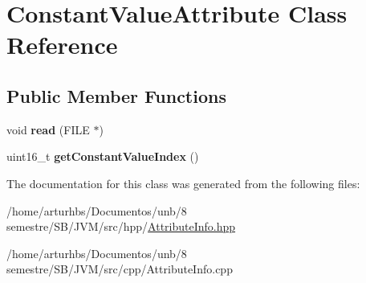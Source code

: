 \hypertarget{classConstantValueAttribute}{}\section{Constant\+Value\+Attribute Class Reference}
\label{classConstantValueAttribute}
\subsection*{Public Member Functions}
\begin{DoxyCompactItemize}
\item 
void {\bfseries read} (F\+I\+LE $\ast$)\hypertarget{classConstantValueAttribute_a736510ad35810b8b06b7fed1065b5f9f}{}\label{classConstantValueAttribute_a736510ad35810b8b06b7fed1065b5f9f}

\item 
uint16\+\_\+t {\bfseries get\+Constant\+Value\+Index} ()\hypertarget{classConstantValueAttribute_ab8f66dc68583f523e052482f14e44c9d}{}\label{classConstantValueAttribute_ab8f66dc68583f523e052482f14e44c9d}

\end{DoxyCompactItemize}


The documentation for this class was generated from the following files\+:\begin{DoxyCompactItemize}
\item 
/home/arturhbs/\+Documentos/unb/8 semestre/\+S\+B/\+J\+V\+M/src/hpp/\hyperlink{AttributeInfo_8hpp}{Attribute\+Info.\+hpp}\item 
/home/arturhbs/\+Documentos/unb/8 semestre/\+S\+B/\+J\+V\+M/src/cpp/Attribute\+Info.\+cpp\end{DoxyCompactItemize}
